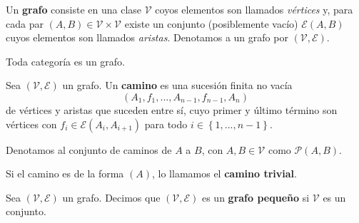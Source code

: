 \documentclass[12pt]{report}
\theoremstyle{largebreak}
\begin{document}
    \begin{mydef}
        Un \textbf{grafo} consiste en una clase $\mathcal{V}$ coyos elementos son llamados \textit{vértices} y, para cada par $(A,B)\in\mathcal{V}\times\mathcal{V}$ existe un conjunto (posiblemente vacío) $\mathcal{E}(A,B)$ cuyos elementos son llamados \textit{aristas}. Denotamos a un grafo por $(\mathcal{V},\mathcal{E})$.
    \end{mydef}

    \begin{obs}
        Toda categoría es un grafo.
    \end{obs}

    \begin{mydef}
        Sea $(\mathcal{V},\mathcal{E})$ un grafo. Un \textbf{camino} es una sucesión finita no vacía
        \begin{equation*}
            \left(A_1,f_1,...,A_{n-1},f_{n-1},A_n \right)
        \end{equation*}
        de vértices y aristas que suceden entre sí, cuyo primer y último término son vértices con $f_i\in\mathcal{E}(A_i,A_{i+1})$ para todo $i\in\left\{1,...,n-1 \right\}$.

        Denotamos al conjunto de caminos de $A$ a $B$, con $A,B\in\mathcal{V}$ como $\mathcal{P}(A,B)$.
    \end{mydef}

    \begin{obs}
        Si el camino es de la forma $(A)$, lo llamamos el \textbf{camino trivial}.
    \end{obs}

    \begin{mydef}
        Sea $(\mathcal{V},\mathcal{E})$ un grafo. Decimos que $(\mathcal{V},\mathcal{E})$ es un \textbf{grafo pequeño} si $\mathcal{V}$ es un conjunto.
    \end{mydef}
\end{document}
